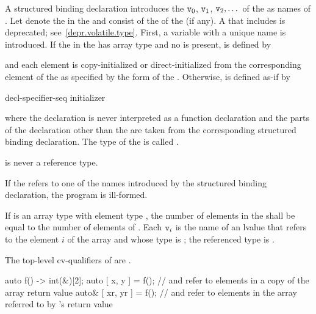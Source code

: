 \pnum
A structured binding declaration introduces the 
$\texttt{v}_0$, $\texttt{v}_1$, $\texttt{v}_2, \dotsc$
of the
 as names
of .
Let \cv{} denote the  in
the  and
 consist of the  of
the  (if any).
A \cv{} that includes  is deprecated;
see~\ref{depr.volatile.type}.
First, a variable with a unique name  is introduced. If the
 in the 
has array type  and no  is present,
 is defined by
\begin{ncbnf}
  \cv{}   \terminal{;}
\end{ncbnf}
and each element is copy-initialized or direct-initialized
from the corresponding element of the  as specified
by the form of the .
Otherwise, 
is defined as-if by
\begin{ncbnf}
 decl-specifier-seq   initializer \terminal{;}
\end{ncbnf}
where
the declaration is never interpreted as a function declaration and
the parts of the declaration other than the  are taken
from the corresponding structured binding declaration.
The type of the 
 is called .
\begin{note}
 is never a reference type.
\end{note}

\pnum
If the  refers to
one of the names introduced by the structured binding declaration,
the program is ill-formed.

\pnum
If  is an array type with element type , the number
of elements in the  shall be equal to the
number of elements of . Each $\texttt{v}_i$ is the name of an
lvalue that refers to the element $i$ of the array and whose type
is ; the referenced type is .
\begin{note}
The top-level cv-qualifiers of  are \cv.
\end{note}
\begin{example}
\begin{codeblock}
auto f() -> int(&)[2];
auto [ x, y ] = f();            //  and  refer to elements in a copy of the array return value
auto& [ xr, yr ] = f();         //  and  refer to elements in the array referred to by 's return value
\end{codeblock}
\end{example}

